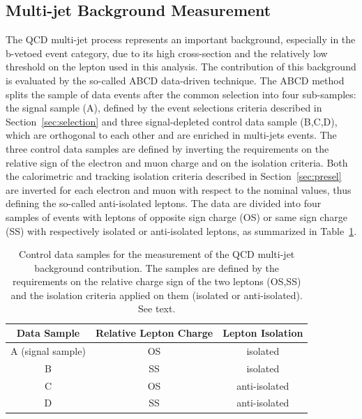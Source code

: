 \subsection{Multi-jet Background Measurement}
\label{sec:qcd}

The QCD multi-jet process represents an important background, 
especially in the b-vetoed event category, due to its high cross-section and the 
relatively low threshold on the lepton \pt used in this analysis. The contribution of this
background is evaluated by the so-called ABCD data-driven technique.
The ABCD method splits the sample of data events after the common selection into four sub-samples: the
signal sample (A), defined by the event selections criteria described in Section~\ref{sec:selection}
and three signal-depleted control data sample (B,C,D), which are orthogonal to each other  and are
enriched in multi-jets events. The three control data samples are defined by inverting the requirements on the relative 
sign of the electron and muon charge  and  on the isolation criteria. 
Both the calorimetric and tracking isolation criteria described in Section~\ref{sec:presel}  are inverted for each electron and muon 
with respect to the nominal values, thus defining the so-called anti-isolated leptons. 
The data are divided into four samples of events with leptons of opposite sign charge (OS) 
or same sign charge (SS) with respectively isolated or anti-isolated leptons, as summarized in Table~\ref{table:qcd}.

\begin{table} [tp]
\centering
\begin{tabular}{c c c }
\hline
Data Sample & Relative Lepton Charge & Lepton Isolation \\ [0.5ex]
\hline
A (signal sample) & OS & isolated \\
\hline
B & SS & isolated \\
C & OS & anti-isolated \\
D & SS & anti-isolated \\ [1ex]
\hline
\end{tabular}
\caption{Control data samples for the measurement of the QCD multi-jet background contribution. The samples are defined by the requirements on the relative
	charge sign of the two leptons (OS,SS) and the isolation criteria applied on them (isolated or anti-isolated). See text.}
\label{table:qcd}
\end{table}

